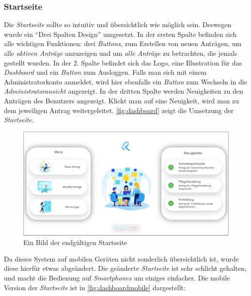 \subsubsection{Startseite}
\label{chapter:implementierung-frontend-komponenten-startseite}
Die \textit{Startseite} sollte so intuitiv und übersichtlich wie möglich sein. Deswegen wurde ein \enquote{Drei Spalten Design} umgesetzt. In der ersten Spalte befinden sich alle wichtigen Funktionen: drei \textit{Buttons}, zum Erstellen von neuen Anträgen, um alle \textit{aktiven Anträge} anzuzeigen und um \textit{alle Anträge} zu betrachten, die jemals gestellt wurden. In der 2. Spalte befindet sich das Logo, eine Illustration für das \textit{Dashboard} und ein \textit{Button} zum Ausloggen. Falls man sich mit einem Administratorkonto anmeldet, wird hier ebenfalls ein \textit{Button} zum Wechseln in die \textit{Administratoransicht} angezeigt. In der dritten Spalte werden Neuigkeiten zu den Anträgen des Benutzers angezeigt. Klickt man auf eine Neuigkeit, wird man zu dem jeweiligen Antrag weitergeleitet. \autoref{fig:dashboard} zeigt die Umsetzung der \textit{Startseite}.
\begin{figure}[H]
	\centering
	\includegraphics[width=1\linewidth]{images/ldehner_implementierung/dashboard}
	\caption[Dashboard Seite]{Ein Bild der endgültigen Startseite}
	\label{fig:dashboard}
\end{figure}
Da dieses System auf mobilen Geräten nicht sonderlich übersichtlich ist, wurde diese hierfür etwas abgeändert. Die geänderte \textit{Startseite} ist sehr schlicht gehalten, und macht die Bedienung auf \textit{Smartphones} um einiges einfacher. Die mobile Version der \textit{Startseite} ist in \autoref{fig:dashboardmobile} dargestellt:
